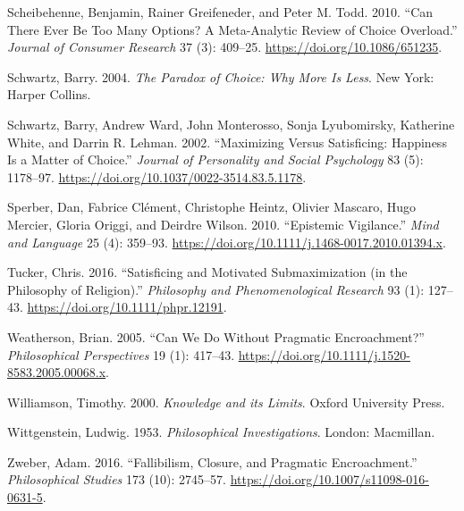 \documentclass[
  12pt,
]{article}
\newlength{\cslhangindent}
\newlength{\cslentryspacingunit} %
\newenvironment{CSLReferences}[2] %
 {%
  \setlength{\parindent}{0pt}
  \ifodd #1
  \let\oldpar\par
  \def\par{\hangindent=\cslhangindent\oldpar}
  \fi
  \setlength{\parskip}{#2\cslentryspacingunit}
 }%
 {}
\begin{document}
\begin{CSLReferences}{1}{0}
\leavevmode{}%
Scheibehenne, Benjamin, Rainer Greifeneder, and Peter M. Todd. 2010. {``Can There Ever Be Too Many Options? A Meta-Analytic Review of Choice Overload.''} \emph{Journal of Consumer Research} 37 (3): 409--25. \url{https://doi.org/10.1086/651235}.

\leavevmode{}%
Schwartz, Barry. 2004. \emph{The Paradox of Choice: Why More Is Less}. New York: Harper Collins.

\leavevmode{}%
Schwartz, Barry, Andrew Ward, John Monterosso, Sonja Lyubomirsky, Katherine White, and Darrin R. Lehman. 2002. {``Maximizing Versus Satisficing: Happiness Is a Matter of Choice.''} \emph{Journal of Personality and Social Psychology} 83 (5): 1178--97. \url{https://doi.org/10.1037/0022-3514.83.5.1178}.

\leavevmode{}%
Sperber, Dan, Fabrice Clément, Christophe Heintz, Olivier Mascaro, Hugo Mercier, Gloria Origgi, and Deirdre Wilson. 2010. {``Epistemic Vigilance.''} \emph{Mind and Language} 25 (4): 359--93. \url{https://doi.org/10.1111/j.1468-0017.2010.01394.x}.

\leavevmode{}%
Tucker, Chris. 2016. {``Satisficing and Motivated Submaximization (in the Philosophy of Religion).''} \emph{Philosophy and Phenomenological Research} 93 (1): 127--43. \url{https://doi.org/10.1111/phpr.12191}.

\leavevmode{}%
Weatherson, Brian. 2005. {``{Can We Do Without Pragmatic Encroachment?}''} \emph{Philosophical Perspectives} 19 (1): 417--43. \url{https://doi.org/10.1111/j.1520-8583.2005.00068.x}.

\leavevmode{}%
Williamson, Timothy. 2000. \emph{{Knowledge and its Limits}}. Oxford University Press.

\leavevmode{}%
Wittgenstein, Ludwig. 1953. \emph{Philosophical Investigations}. London: Macmillan.

\leavevmode{}%
Zweber, Adam. 2016. {``Fallibilism, Closure, and Pragmatic Encroachment.''} \emph{Philosophical Studies} 173 (10): 2745--57. \url{https://doi.org/10.1007/s11098-016-0631-5}.

\end{CSLReferences}
\end{document}
